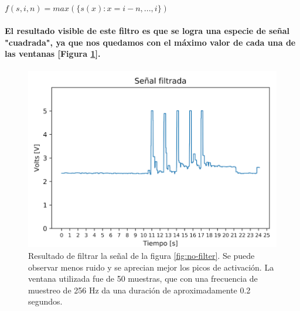 \documentclass{article}
\begin{document}
\begin{center}
$f(s, i, n) = max(\big\{ s(x) : x = i - n, ..., i\big\})$
\end{center}

\paragraph{
El resultado visible de este filtro es que se logra una especie de señal "cuadrada", ya que nos quedamos con el máximo valor de cada una de las ventanas [Figura \ref{fig:filtered}].
}

\begin{figure}[ht]
    \centering
    \includegraphics[width=\textwidth]{filtered.png}%
    \caption{Resultado de filtrar la señal de la figura \ref{fig:no-filter}. Se puede observar menos ruido y se aprecian mejor los picos de activación. La ventana utilizada fue de 50 muestras, que con una frecuencia de muestreo de 256 Hz da una duración de aproximadamente 0.2 segundos.}
    \label{fig:filtered}
\end{figure}
\end{document}

